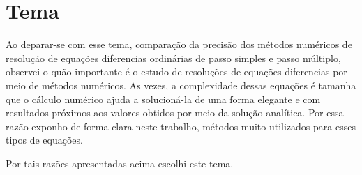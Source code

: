 \section{Tema}\label{ltema}

Ao deparar-se com esse tema, comparação da precisão dos métodos numéricos 
de resolução de equações diferencias ordinárias de passo simples e passo múltiplo,
observei o quão importante é o estudo de 
resoluções de equações diferencias por meio de métodos numéricos. As 
vezes, a complexidade dessas equações é tamanha que o cálculo numérico 
ajuda a solucioná-la de uma forma elegante e com resultados próximos 
aos valores obtidos por meio da solução analítica. Por essa razão 
exponho de forma clara neste trabalho, métodos muito utilizados 
para esses tipos de equações. 

Por tais razões apresentadas acima escolhi este tema.
